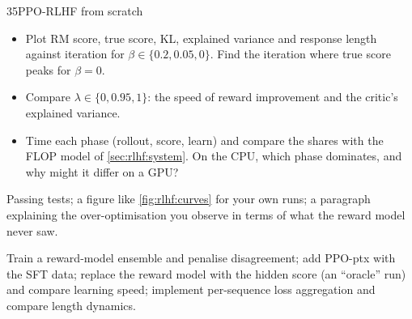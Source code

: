 \begin{labbox}{35}{PPO-RLHF from scratch}
\begin{itemize}
  \item Plot RM score, true score, KL, explained variance and response length against iteration for
        $\beta\in\{0.2, 0.05, 0\}$. Find the iteration where true score peaks for $\beta=0$.
  \item Compare $\lambda\in\{0, 0.95, 1\}$: the speed of reward improvement and the critic's explained variance.
  \item Time each phase (rollout, score, learn) and compare the shares with the FLOP model of
        \cref{sec:rlhf:system}. On the CPU, which phase dominates, and why might it differ on a GPU?
\end{itemize}

Passing tests; a figure like \cref{fig:rlhf:curves} for your own runs; a paragraph explaining the
over-optimisation you observe in terms of what the reward model never saw.

Train a reward-model ensemble and penalise disagreement; add PPO-ptx with the SFT data; replace the reward
model with the hidden score (an ``oracle'' run) and compare learning speed; implement per-sequence loss
aggregation and compare length dynamics.
\end{labbox}
